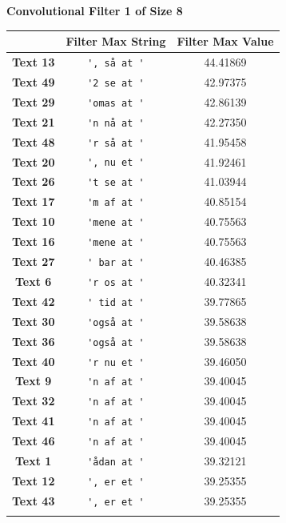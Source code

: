 \begin{table}
    \centering
    \textbf{Convolutional Filter 1 of Size 8}\par\medskip
    \begin{tabular}{c|cc}
        & \textbf{Filter Max String} & \textbf{Filter Max Value} \\ \hline
        \textbf{Text 13}  & \verb{', så at '{  & 44.41869 \\
        \textbf{Text 49}  & \verb{'2 se at '{  & 42.97375 \\
        \textbf{Text 29}  & \verb{'omas at '{  & 42.86139 \\
        \textbf{Text 21}  & \verb{'n nå at '{  & 42.27350 \\
        \textbf{Text 48}  & \verb{'r så at '{  & 41.95458 \\
        \textbf{Text 20}  & \verb{', nu et '{  & 41.92461 \\
        \textbf{Text 26}  & \verb{'t se at '{  & 41.03944 \\
        \textbf{Text 17}  & \verb{'m af at '{  & 40.85154 \\
        \textbf{Text 10}  & \verb{'mene at '{  & 40.75563 \\
        \textbf{Text 16}  & \verb{'mene at '{  & 40.75563 \\
        \textbf{Text 27}  & \verb{' bar at '{  & 40.46385 \\
        \textbf{Text 6}   & \verb{'r os at '{  & 40.32341 \\
        \textbf{Text 42}  & \verb{' tid at '{  & 39.77865 \\
        \textbf{Text 30}  & \verb{'også at '{  & 39.58638 \\
        \textbf{Text 36}  & \verb{'også at '{  & 39.58638 \\
        \textbf{Text 40}  & \verb{'r nu et '{  & 39.46050 \\
        \textbf{Text 9}   & \verb{'n af at '{  & 39.40045 \\
        \textbf{Text 32}  & \verb{'n af at '{  & 39.40045 \\
        \textbf{Text 41}  & \verb{'n af at '{  & 39.40045 \\
        \textbf{Text 46}  & \verb{'n af at '{  & 39.40045 \\
        \textbf{Text 1}   & \verb{'ådan at '{  & 39.32121 \\
        \textbf{Text 12}  & \verb{', er et '{  & 39.25355 \\
        \textbf{Text 43}  & \verb{', er et '{  & 39.25355 \\
}}}}}}}}}}}}}}}}}}}}}}}
\end{tabular}
\end{table}
